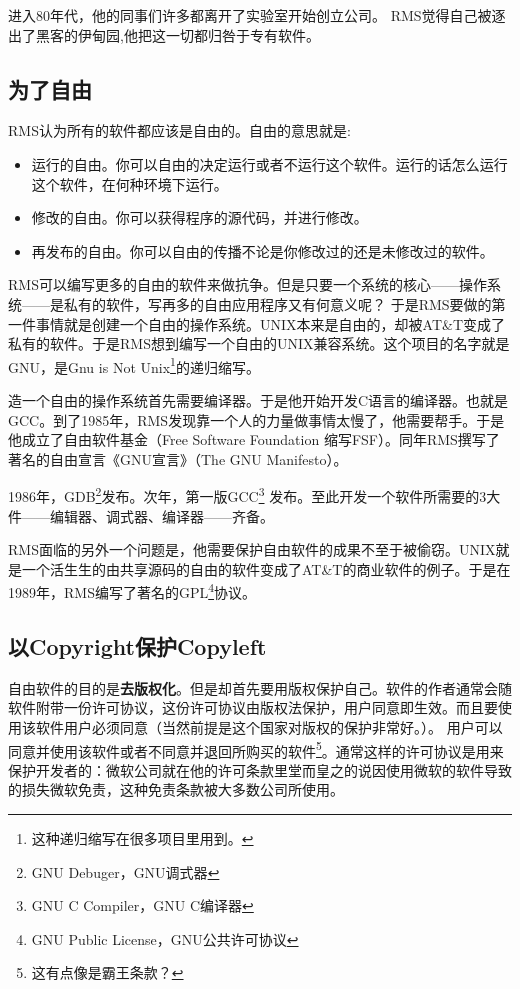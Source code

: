 \documentclass[amstex]{ctexbook}
\begin{document}
进入80年代，他的同事们许多都离开了实验室开始创立公司。
RMS觉得自己被逐出了黑客的伊甸园,他把这一切都归咎于专有软件。

\subsection{为了自由}

RMS认为所有的软件都应该是自由的。自由的意思就是:
\begin{itemize}
\item 运行的自由。你可以自由的决定运行或者不运行这个软件。运行的话怎么运行这个软件，在何种环境下运行。
\item 修改的自由。你可以获得程序的源代码，并进行修改。
\item 再发布的自由。你可以自由的传播不论是你修改过的还是未修改过的软件。
\end{itemize}

RMS可以编写更多的自由的软件来做抗争。但是只要一个系统的核心------操作系统------是私有的软件，写再多的自由应用程序又有何意义呢？
于是RMS要做的第一件事情就是创建一个自由的操作系统。UNIX本来是自由的，却被AT\&T变成了私有的软件。于是RMS想到编写一个自由的UNIX兼容系统。这个项目的名字就是GNU，是Gnu is Not Unix\footnote{这种递归缩写在很多项目里用到。}的递归缩写。

造一个自由的操作系统首先需要编译器。于是他开始开发C语言的编译器。也就是GCC。到了1985年，RMS发现靠一个人的力量做事情太慢了，他需要帮手。于是他成立了自由软件基金（Free Software Foundation 缩写FSF）。同年RMS撰写了著名的自由宣言《GNU宣言》（The GNU Manifesto）。

1986年，GDB\footnote{GNU Debuger，GNU调式器}发布。次年，第一版GCC\footnote{GNU C Compiler，GNU C编译器} 发布。至此开发一个软件所需要的3大件------编辑器、调式器、编译器------齐备。

RMS面临的另外一个问题是，他需要保护自由软件的成果不至于被偷窃。UNIX就是一个活生生的由共享源码的自由的软件变成了AT\&T的商业软件的例子。于是在1989年，RMS编写了著名的GPL\footnote{GNU Public License，GNU公共许可协议}协议。

\subsection{以Copyright保护Copyleft}

自由软件的目的是\textbf{去版权化}。但是却首先要用版权保护自己。软件的作者通常会随软件附带一份许可协议，这份许可协议由版权法保护，用户同意即生效。而且要使用该软件用户必须同意（当然前提是这个国家对版权的保护非常好。）。
用户可以同意并使用该软件或者不同意并退回所购买的软件\footnote{这有点像是霸王条款？}。通常这样的许可协议是用来保护开发者的：微软公司就在他的许可条款里堂而皇之的说因使用微软的软件导致的损失微软免责，这种免责条款被大多数公司所使用。
\end{document}
